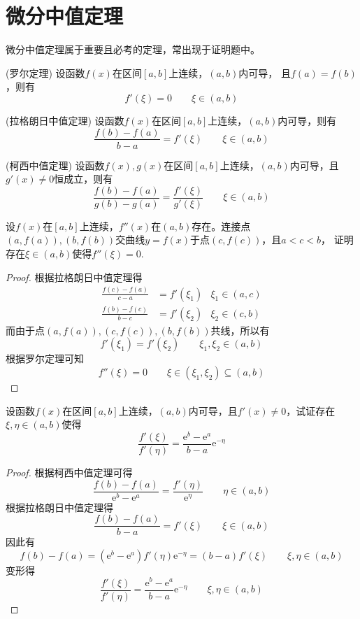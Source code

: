 \section{微分中值定理}
微分中值定理属于重要且必考的定理，常出现于证明题中。
\begin{theorem}
    (罗尔定理)
    \label{th:罗尔定理}
    设函数$f(x)$在区间$[a,b]$上连续，$(a,b)$内可导，
    且$f(a)=f(b)$，则有
    \[ f'(\xi) = 0 \qquad \xi \in (a,b)\]
\end{theorem}

\begin{theorem}
    (拉格朗日中值定理)
    \label{th:拉格朗日中值定理}
    设函数$f(x)$在区间$[a,b]$上连续，$(a,b)$内可导，则有
    \[ \frac{f(b)-f(a)}{b-a} = f'(\xi) \qquad \xi \in (a,b)\]
\end{theorem}

\begin{theorem}
    (柯西中值定理)
    \label{th:柯西中值定理}
    设函数$f(x),g(x)$在区间$[a,b]$上连续，$(a,b)$内可导，且$g'(x)\neq0$恒成立，则有
    \[ \frac{f(b)-f(a)}{g(b)-g(a)} = \frac{f'(\xi)}{g'(\xi)} \qquad \xi \in (a,b)\]
\end{theorem}

\begin{example}
    设$f(x)$在$[a,b]$上连续，$f''(x)$在$(a,b)$存在。连接点$(a,f(a)),(b,f(b))$交曲线$y=f(x)$于点$(c,f(c))$，且$a<c<b$，
    证明存在$\xi\in(a,b)$使得$f''(\xi)=0$.
\end{example}
\begin{proof}
    根据拉格朗日中值定理得
    \begin{align*}
        \frac{f(c)-f(a)}{c-a} & = f'(\xi_1) & \xi_1 \in (a,c) \\
        \frac{f(b)-f(c)}{b-c} & = f'(\xi_2) & \xi_2 \in (c,b)
    \end{align*}
    而由于点$(a,f(a)),(c,f(c)),(b,f(b))$共线，所以有
    \[ f'(\xi_1) = f'(\xi_2) \qquad \xi_1,\xi_2 \in (a,b) \]
    根据罗尔定理可知
    \[ f''(\xi) = 0  \qquad \xi \in (\xi_1,\xi_2) \subseteq (a,b) \]
\end{proof}


\begin{example}
    设函数$f(x)$在区间$[a,b]$上连续，$(a,b)$内可导，且$f'(x)\neq 0$，试证存在$\xi,\eta \in (a,b)$使得
    \[ \frac{f'(\xi)}{f'(\eta)} = \frac{\mathrm{e}^b-\mathrm{e}^a}{b-a}\mathrm{e}^{-\eta} \]
\end{example}

\begin{proof}
    根据柯西中值定理可得
    \[ \frac{f(b)-f(a)}{\mathrm{e}^b-\mathrm{e}^a} = \frac{f'(\eta)}{\mathrm{e}^\eta} \qquad \eta \in (a,b) \]
    根据拉格朗日中值定理得
    \[ \frac{f(b)-f(a)}{b-a} = f'(\xi) \qquad \xi \in (a,b) \]
    因此有
    \[ f(b)-f(a) = \left( \mathrm{e}^b - \mathrm{e}^a \right)f'(\eta)\mathrm{e}^{-\eta}=(b-a)f'(\xi)  \qquad \xi,\eta \in (a,b) \]
    变形得
    \[ \frac{f'(\xi)}{f'(\eta)} = \frac{\mathrm{e}^b-\mathrm{e}^a}{b-a}\mathrm{e}^{-\eta} \qquad \xi,\eta \in (a,b) \]
\end{proof}

